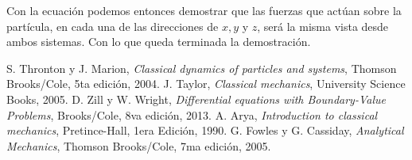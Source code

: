 \documentclass[a4paper,10pt]{article}
\numberwithin{equation}{section}
\begin{document}
Con la ecuación  podemos entonces demostrar que las fuerzas
que actúan sobre la partícula, en cada una de las direcciones de $x, y$ y $z$, será la 
misma vista desde ambos sistemas. Con lo que queda terminada la demostración.


\vspace{.3cm}

\begin{thebibliography}{10}
 S. Thronton y J. Marion, \textit{Classical dynamics of particles and systems}, Thomson Brooks/Cole,
 5ta edición, 2004.
 J. Taylor, \textit{Classical mechanics}, University Science Books, 2005.
 D. Zill y W. Wright, \textit{Differential equations with Boundary-Value Problems}, Brooks/Cole,
 8va edición, 2013.
 A. Arya, \textit{Introduction to classical mechanics}, Pretince-Hall, 1era Edición,
 1990.
 G. Fowles y G. Cassiday, \emph{Analytical Mechanics}, Thomson Brooks/Cole, 
 7ma edición, 2005.
\end{thebibliography}
\end{document}
